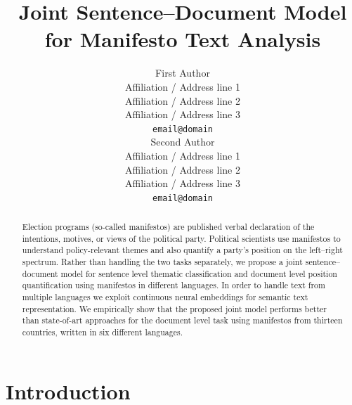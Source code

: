 \documentclass[11pt,a4paper]{article}
\title{Joint Sentence--Document Model for Manifesto Text Analysis}
\author{First Author \\
  Affiliation / Address line 1 \\
  Affiliation / Address line 2 \\
  Affiliation / Address line 3 \\
  {\tt email@domain} \\\And
  Second Author \\
  Affiliation / Address line 1 \\
  Affiliation / Address line 2 \\
  Affiliation / Address line 3 \\
  {\tt email@domain} \\}
\date{}
\begin{document}
\maketitle


\begin{abstract}
Election programs (so-called manifestos) are published verbal declaration of the intentions, motives, or views of the political party. Political scientists use manifestos to understand policy-relevant themes  and also quantify a party's position on the left--right spectrum. Rather than handling the two tasks separately, we propose a joint sentence--document model for sentence level thematic classification and document level position quantification using manifestos in different languages. In order to handle text from multiple languages we exploit continuous neural embeddings for semantic text representation. We empirically show that the proposed joint model performs better than state-of-art approaches for the document level task using manifestos from thirteen countries, written in six different languages.
\end{abstract}

\section{Introduction}

\end{document}
